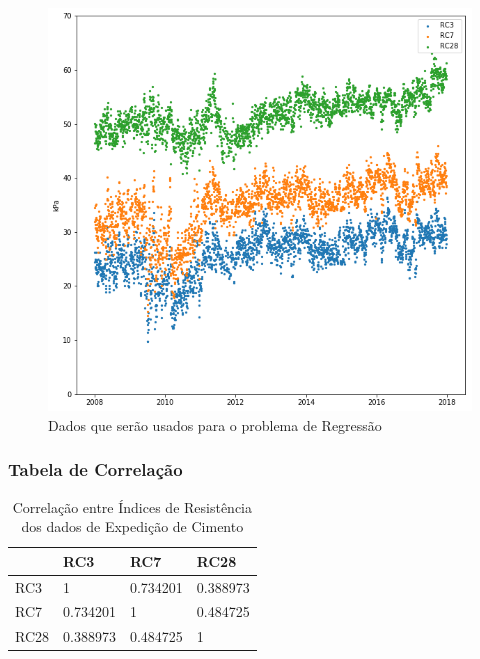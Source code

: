 \documentclass{beamer}
\begin{document}
\begin{frame}
\begin{figure}[H]
\centering
\includegraphics[scale=0.4]{slides_dados}
\caption{Dados que serão usados para o problema de Regressão}
\end{figure}

\end{frame}


\begin{frame}
\frametitle{Tabela de Correlação}
\begin{table}[H]
\centering
\begin{tabular}{l|lll}
\cline{2-4}
\textbf{}                  & \multicolumn{1}{l|}{RC3} & \multicolumn{1}{l|}{RC7} & \multicolumn{1}{l|}{RC28} \\ \hline
\multicolumn{1}{|l|}{RC3}  & 1                        & 0.734201                 & 0.388973                  \\ \cline{1-1}
\multicolumn{1}{|l|}{RC7}  & 0.734201                 & 1                        & 0.484725                  \\ \cline{1-1}
\multicolumn{1}{|l|}{RC28} & 0.388973                 & 0.484725                 & 1                         \\ \cline{1-1}
\end{tabular}
\caption{Correlação entre Índices de Resistência dos dados de
  Expedição de Cimento}
\label{corr3728}
\end{table}

\end{frame}
\end{document}
